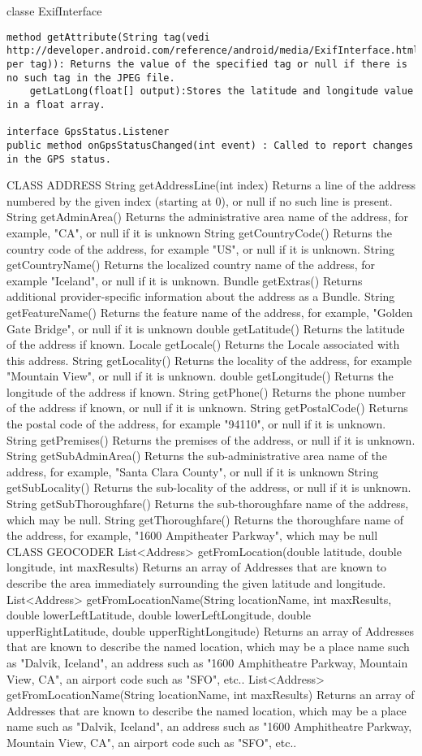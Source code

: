 \documentclass[letterpaper,twocolumn,10pt]{article}
\begin{document}
classe ExifInterface
\begin{verbatim}
method getAttribute(String tag(vedi http://developer.android.com/reference/android/media/ExifInterface.html per tag)): Returns the value of the specified tag or null if there is no such tag in the JPEG file.
	getLatLong(float[] output):Stores the latitude and longitude value in a float array.

interface GpsStatus.Listener 
public method onGpsStatusChanged(int event) : Called to report changes in the GPS status.
\end{verbatim}
CLASS ADDRESS
String	 getAddressLine(int index)
Returns a line of the address numbered by the given index (starting at 0), or null if no such line is present.
String	 getAdminArea()
Returns the administrative area name of the address, for example, "CA", or null if it is unknown
String	 getCountryCode()
Returns the country code of the address, for example "US", or null if it is unknown.
String	 getCountryName()
Returns the localized country name of the address, for example "Iceland", or null if it is unknown.
Bundle	 getExtras()
Returns additional provider-specific information about the address as a Bundle.
String	 getFeatureName()
Returns the feature name of the address, for example, "Golden Gate Bridge", or null if it is unknown
double	 getLatitude()
Returns the latitude of the address if known.
Locale	 getLocale()
Returns the Locale associated with this address.
String	 getLocality()
Returns the locality of the address, for example "Mountain View", or null if it is unknown.
double	 getLongitude()
Returns the longitude of the address if known.
String	 getPhone()
Returns the phone number of the address if known, or null if it is unknown.
String	 getPostalCode()
Returns the postal code of the address, for example "94110", or null if it is unknown.
String	 getPremises()
Returns the premises of the address, or null if it is unknown.
String	 getSubAdminArea()
Returns the sub-administrative area name of the address, for example, "Santa Clara County", or null if it is unknown
String	 getSubLocality()
Returns the sub-locality of the address, or null if it is unknown.
String	 getSubThoroughfare()
Returns the sub-thoroughfare name of the address, which may be null.
String	 getThoroughfare()
Returns the thoroughfare name of the address, for example, "1600 Ampitheater Parkway", which may be null
CLASS GEOCODER
List<Address>	 getFromLocation(double latitude, double longitude, int maxResults)
Returns an array of Addresses that are known to describe the area immediately surrounding the given latitude and longitude.
List<Address>	 getFromLocationName(String locationName, int maxResults, double lowerLeftLatitude, double lowerLeftLongitude, double upperRightLatitude, double upperRightLongitude)
Returns an array of Addresses that are known to describe the named location, which may be a place name such as "Dalvik, Iceland", an address such as "1600 Amphitheatre Parkway, Mountain View, CA", an airport code such as "SFO", etc..
List<Address>	 getFromLocationName(String locationName, int maxResults)
Returns an array of Addresses that are known to describe the named location, which may be a place name such as "Dalvik, Iceland", an address such as "1600 Amphitheatre Parkway, Mountain View, CA", an airport code such as "SFO", etc..
\end{document}
